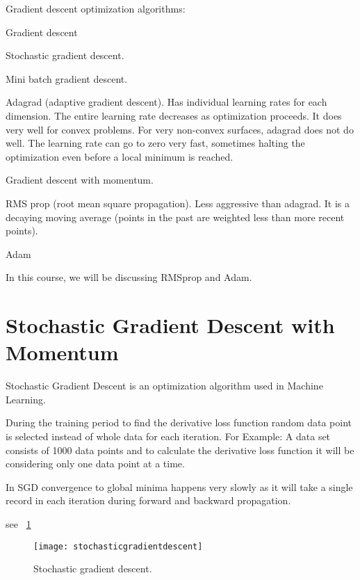 Gradient descent optimization algorithms:
	\begin{bulletedlist}
		\item Gradient descent
		\item Stochastic gradient descent.
		\item Mini batch gradient descent.
		\item Adagrad (adaptive gradient descent).  Has individual learning rates for each dimension.  The entire learning rate decreases as optimization proceeds.  It does very well for convex problems.  For very non-convex surfaces, adagrad does not do well.  The learning rate can go to zero very fast, sometimes halting the optimization even before a local minimum is reached.
		\item Gradient descent with momentum.
		\item RMS prop (root mean square propagation).  Less aggressive than adagrad.  It is a decaying moving average (points in the past are weighted less than more recent points).
		\item Adam
	\end{bulletedlist}

In this course, we will be discussing RMSprop and Adam.

	\section{Stochastic Gradient Descent with Momentum}

	\begin{bulletedlist}
		\item Stochastic Gradient Descent is an optimization algorithm used in Machine Learning.
		\item During the training period to find the derivative loss function random data point is selected instead of whole data for each iteration.  For Example: A data set consists of 1000 data points and to calculate the derivative loss function it will be considering only one data point at a time.
		\item In SGD convergence to global minima happens very slowly as it will take a single record in each iteration during forward and backward propagation.
	\end{bulletedlist}
see \figurename~\ref{fig:stochasticgradientdescent}
 	\begin{figure}[h]
		\centering
		\texttt{[image: stochasticgradientdescent]}
		\caption[Stochastic gradient descent]{Stochastic gradient descent.}
		\label{fig:stochasticgradientdescent}
	\end{figure}

